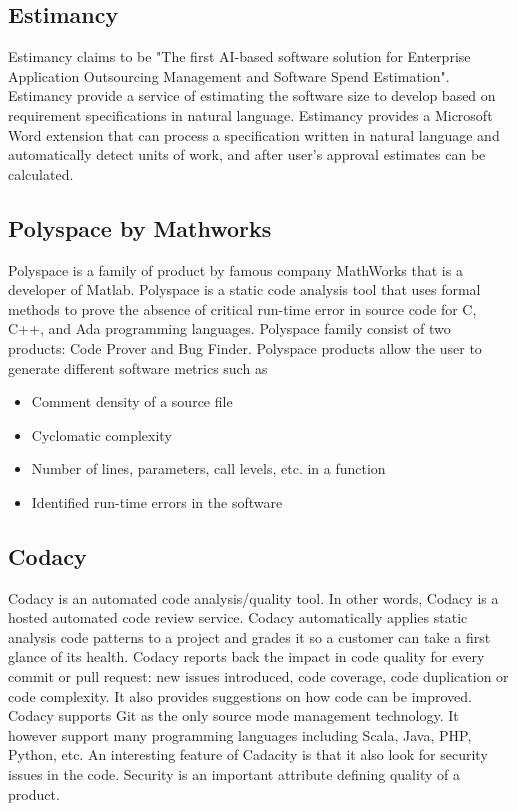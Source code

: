 \documentclass[11pt]{article}
\begin{document}
\subsection{Estimancy}
Estimancy claims to be "The first AI-based software solution for Enterprise Application Outsourcing Management and Software Spend Estimation". Estimancy provide a service of estimating the software size to develop based on requirement specifications in natural language. Estimancy provides a Microsoft Word extension that can process a specification written in natural language and automatically detect units of work, and after user's approval estimates can be calculated.
\subsection{Polyspace by Mathworks}
Polyspace is a family of product by famous company MathWorks that is a developer of Matlab. Polyspace is a static code analysis tool that uses formal methods to prove the absence of critical run-time error in source code for C, C++, and Ada programming languages. Polyspace family consist of two products: Code Prover and Bug Finder.
Polyspace products allow the user to generate different software metrics such as
\begin{itemize}
	\item Comment density of a source file
	\item Cyclomatic complexity
	\item Number of lines, parameters, call levels, etc. in a function
	\item Identified run-time errors in the software
\end{itemize}

\subsection{Codacy}
Codacy is an automated code analysis/quality tool. In other words, Codacy is a hosted automated code review service. 
Codacy automatically applies static analysis code patterns to a project and grades it so a customer can take a first glance of its health. Codacy reports back the impact in code quality for every commit or pull request: new issues introduced, code coverage, code duplication or code complexity. It also provides suggestions on how code can be improved. Codacy supports Git as the only source mode management technology. It however support many programming languages including Scala, Java, PHP, Python, etc. An interesting feature of Cadacity is that it also look for security issues in the code. Security is an important attribute defining quality of a product.
\end{document}
